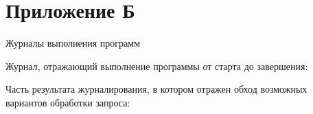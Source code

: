 \chapter*{Приложение Б}
\centerline{Журналы выполнения программ}

Журнал, отражающий выполнение программы от старта до завершения:


\newpage
Часть результата журналирования, в котором отражен обход возможных вариантов обработки запроса:

